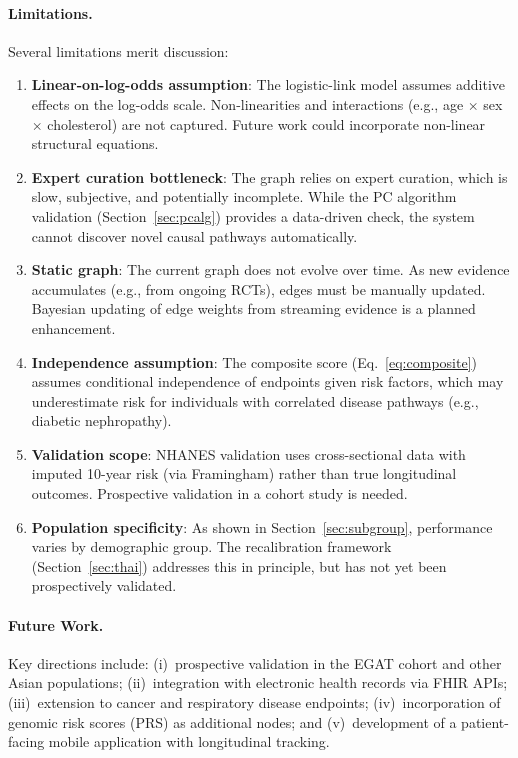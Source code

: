 \documentclass[runningheads]{llncs}
\begin{document}
\paragraph{Limitations.}
Several limitations merit discussion:
\begin{enumerate}
\item \textbf{Linear-on-log-odds assumption}: The logistic-link
  model assumes additive effects on the log-odds scale.
  Non-linearities and interactions (e.g., age $\times$ sex $\times$
  cholesterol) are not captured.  Future work could incorporate
  non-linear structural equations.
\item \textbf{Expert curation bottleneck}: The graph relies on
  expert curation, which is slow, subjective, and potentially
  incomplete.  While the PC algorithm validation
  (Section~\ref{sec:pcalg}) provides a data-driven check, the system
  cannot discover novel causal pathways automatically.
\item \textbf{Static graph}: The current graph does not evolve over
  time.  As new evidence accumulates (e.g., from ongoing RCTs),
  edges must be manually updated.  Bayesian updating of edge weights
  from streaming evidence is a planned enhancement.
\item \textbf{Independence assumption}: The composite score
  (Eq.~\ref{eq:composite}) assumes conditional independence of
  endpoints given risk factors, which may underestimate risk for
  individuals with correlated disease pathways (e.g., diabetic
  nephropathy).
\item \textbf{Validation scope}: NHANES validation uses
  cross-sectional data with imputed 10-year risk (via Framingham)
  rather than true longitudinal outcomes.  Prospective validation in
  a cohort study is needed.
\item \textbf{Population specificity}: As shown in
  Section~\ref{sec:subgroup}, performance varies by demographic
  group.  The recalibration framework
  (Section~\ref{sec:thai}) addresses this in principle, but has
  not yet been prospectively validated.
\end{enumerate}

\paragraph{Future Work.}
Key directions include: (i)~prospective validation in the EGAT cohort
and other Asian populations; (ii)~integration with electronic health
records via FHIR APIs; (iii)~extension to cancer and respiratory
disease endpoints; (iv)~incorporation of genomic risk scores (PRS)
as additional nodes; and (v)~development of a patient-facing mobile
application with longitudinal tracking.
\end{document}
